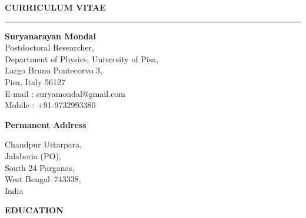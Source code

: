 \documentclass[12pt]{article}
\begin{document}
\hypersetup{urlcolor=DarkBlue}
\pagestyle{plain}
\flushleft
{\bf {CURRICULUM VITAE }}\\
\noindent\rule{18cm}{0.2pt}
\vspace{0.05cm}
\noindent

\begin{minipage}{0.8\textwidth}
 {\bf{Suryanarayan Mondal}} \\[0.4em]
 Postdoctoral Researcher,\\
 Department of Physics,
 University of Pisa,\\
 Largo Bruno Pontecorvo 3,\\
 Pisa, Italy 56127 \\
 E-mail : suryamondal@gmail.com\\
 Mobile : +91-9732993380 \\[0.1em]
\end{minipage}%

\vspace{0.6cm}
{\bf {Permanent Address }}\\
\begin{minipage}{0.8\textwidth}
  \vspace{0.3cm}
  Chandpur Uttarpara,\\
  Jalaberia (PO),\\
  South 24 Parganas,\\
  West Bengal--743338,\\
  India
\end{minipage}

\vspace{2cm}
\colorbox{gray!40}{\begin{minipage}{17.5cm}
\bf { EDUCATION} 
\end{minipage} }
\end{document}
